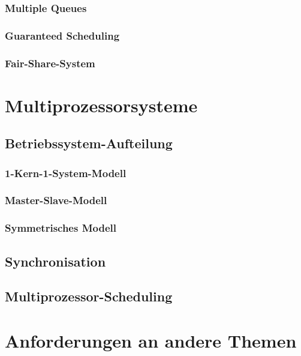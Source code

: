 \subsubsection{Multiple Queues}
\subsubsection{Guaranteed Scheduling}
\subsubsection{Fair-Share-System}
\section{Multiprozessorsysteme}
\subsection{Betriebssystem-Aufteilung}
\subsubsection{1-Kern-1-System-Modell}
\subsubsection{Master-Slave-Modell}
\subsubsection{Symmetrisches Modell}
\subsection{Synchronisation}
\subsection{Multiprozessor-Scheduling}

\pagebreak
\nocite{*}



\pagebreak
\section*{Anforderungen an andere Themen}